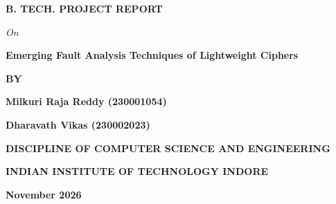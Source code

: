 
\begin{titlepage}
\centering
\vspace*{0.5cm}
{\huge \textbf{B. TECH. PROJECT REPORT}\par}
\vspace{1.0cm}
{\Large \textit{On}\par}
\vspace{1.0cm}
{\huge \textbf{\textcolor{NavyBlue}{Emerging Fault Analysis Techniques of Lightweight Ciphers}}\par}
\vspace{2.5cm}
{\Large \textbf{BY}\par}
\vspace{0.8cm}
{\LARGE \textbf{Milkuri Raja Reddy (230001054)}\par}
\vspace{0.3cm}
{\LARGE \textbf{Dharavath Vikas (230002023)}\par}
\vfill
{\Large \textbf{DISCIPLINE OF COMPUTER SCIENCE AND ENGINEERING}\par}
\vspace{0.4cm}
{\Large \textbf{INDIAN INSTITUTE OF TECHNOLOGY INDORE}\par}
\vspace{0.4cm}
{\Large \textbf{November 2026}\par}
\vspace*{0.5cm}
\end{titlepage}

\cleardoublepage

